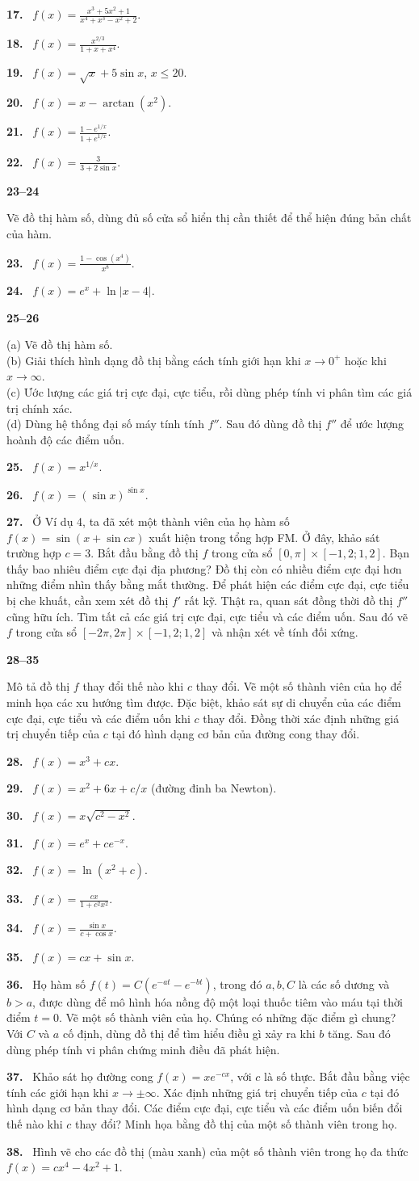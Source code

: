 \documentclass[12pt,a4paper]{article}
\newcommand{\bt}[1]{\par\smallskip\Needspace{5\baselineskip}\noindent\textbf{#1.}\ }
\newcommand{\group}[1]{\par\medskip\noindent\textbf{#1}\par\nopagebreak[4]}
\begin{document}
\bt{17} $\displaystyle f(x)=\frac{x^3+5x^2+1}{x^4+x^3-x^2+2}$.
\bt{18} $\displaystyle f(x)=\frac{x^{2/3}}{1+x+x^4}$.
\bt{19} $f(x)=\sqrt{x}+5\sin x$, $x\le20$.
\bt{20} $f(x)=x-\arctan(x^2)$.
\bt{21} $\displaystyle f(x)=\frac{1-e^{1/x}}{1+e^{1/x}}$.
\bt{22} $\displaystyle f(x)=\frac3{3+2\sin x}$.
\group{23–24}
Vẽ đồ thị hàm số, dùng đủ số cửa sổ hiển thị cần thiết để thể hiện đúng bản chất của hàm.
\bt{23} $\displaystyle f(x)=\frac{1-\cos(x^4)}{x^8}$.
\bt{24} $f(x)=e^x+\ln|x-4|$.
\group{25–26}
(a) Vẽ đồ thị hàm số.\\
(b) Giải thích hình dạng đồ thị bằng cách tính giới hạn khi $x\to0^+$ hoặc khi $x\to\infty$.\\
(c) Ước lượng các giá trị cực đại, cực tiểu, rồi dùng phép tính vi phân tìm các giá trị chính xác.\\
(d) Dùng hệ thống đại số máy tính tính $f''$. Sau đó dùng đồ thị $f''$ để ước lượng hoành độ các điểm uốn.
\bt{25} $f(x)=x^{1/x}$.
\bt{26} $f(x)=(\sin x)^{\sin x}$.
\bt{27} Ở Ví dụ 4, ta đã xét một thành viên của họ hàm số $f(x)=\sin(x+\sin cx)$ xuất hiện trong tổng hợp FM. Ở đây, khảo sát trường hợp $c=3$. Bắt đầu bằng đồ thị $f$ trong cửa sổ $[0,\pi]\times[-1{,}2;1{,}2]$. Bạn thấy bao nhiêu điểm cực đại địa phương? Đồ thị còn có nhiều điểm cực đại hơn những điểm nhìn thấy bằng mắt thường. Để phát hiện các điểm cực đại, cực tiểu bị che khuất, cần xem xét đồ thị $f'$ rất kỹ. Thật ra, quan sát đồng thời đồ thị $f''$ cũng hữu ích. Tìm tất cả các giá trị cực đại, cực tiểu và các điểm uốn. Sau đó vẽ $f$ trong cửa sổ $[-2\pi,2\pi]\times[-1{,}2;1{,}2]$ và nhận xét về tính đối xứng.
\group{28–35}
Mô tả đồ thị $f$ thay đổi thế nào khi $c$ thay đổi. Vẽ một số thành viên của họ để minh họa các xu hướng tìm được. Đặc biệt, khảo sát sự di chuyển của các điểm cực đại, cực tiểu và các điểm uốn khi $c$ thay đổi. Đồng thời xác định những giá trị chuyển tiếp của $c$ tại đó hình dạng cơ bản của đường cong thay đổi.
\bt{28} $f(x)=x^3+cx$.
\bt{29} $f(x)=x^2+6x+c/x$ (đường đinh ba Newton).
\bt{30} $f(x)=x\sqrt{c^2-x^2}$.
\bt{31} $f(x)=e^x+ce^{-x}$.
\bt{32} $f(x)=\ln(x^2+c)$.
\bt{33} $\displaystyle f(x)=\frac{cx}{1+c^2x^2}$.
\bt{34} $\displaystyle f(x)=\frac{\sin x}{c+\cos x}$.
\bt{35} $f(x)=cx+\sin x$.
\bt{36} Họ hàm số $f(t)=C(e^{-at}-e^{-bt})$, trong đó $a,b,C$ là các số dương và $b>a$, được dùng để mô hình hóa nồng độ một loại thuốc tiêm vào máu tại thời điểm $t=0$. Vẽ một số thành viên của họ. Chúng có những đặc điểm gì chung? Với $C$ và $a$ cố định, dùng đồ thị để tìm hiểu điều gì xảy ra khi $b$ tăng. Sau đó dùng phép tính vi phân chứng minh điều đã phát hiện.
\bt{37} Khảo sát họ đường cong $f(x)=xe^{-cx}$, với $c$ là số thực. Bắt đầu bằng việc tính các giới hạn khi $x\to\pm\infty$. Xác định những giá trị chuyển tiếp của $c$ tại đó hình dạng cơ bản thay đổi. Các điểm cực đại, cực tiểu và các điểm uốn biến đổi thế nào khi $c$ thay đổi? Minh họa bằng đồ thị của một số thành viên trong họ.
\bt{38} Hình vẽ cho các đồ thị (màu xanh) của một số thành viên trong họ đa thức $f(x)=cx^4-4x^2+1$.
\end{document}
